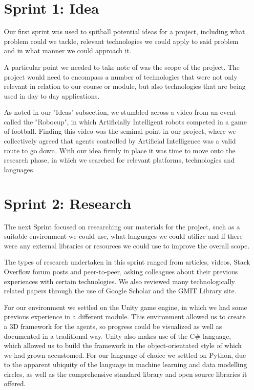 \section{Sprint 1: Idea}
	
	Our first sprint was used to spitball potential ideas for a project, including what problem could we tackle, relevant technologies we could apply to said problem and in what manner we could approach it.
	
	A particular point we needed to take note of was the scope of the project. The project would need to encompass a number of technologies that were not only relevant in relation to our course or module, but also technologies that are being used in day to day applications. 
	
	As noted in our "Ideas" subsection, we stumbled across a video from an event called the "Robocup", in which Artificially Intelligent robots competed in a game of football. Finding this video was the seminal point in our project, where we collectively agreed that agents controlled by Artificial Intelligence was a valid route to go down. With our idea firmly in place it was time to move onto the research phase, in which we searched for relevant platforms, technologies and languages.
	
\section{Sprint 2: Research}
	
	The next Sprint focused on researching our materials for the project, such as a suitable environment we could use, what languages we could utilize and if there were any external libraries or resources we could use to improve the overall scope.
	
	The types of research undertaken in this sprint ranged from articles, videos, Stack Overflow forum posts and peer-to-peer, asking colleagues about their previous experiences with certain technologies. We also reviewed many technologically related papers through the use of Google Scholar and the GMIT Library site.
	
	For our environment we settled on the Unity game engine, in which we had some previous experience in a different module. This environment allowed us to create a 3D framework for the agents, so progress could be visualized as well as documented in a traditional way. Unity also makes use of the C\# language, which allowed us to build the framework in the object-orientated style of which we had grown accustomed. For our language of choice we settled on Python, due to the apparent ubiquity of the language in machine learning and data modelling circles, as well as the comprehensive standard library and open source libraries it offered.

